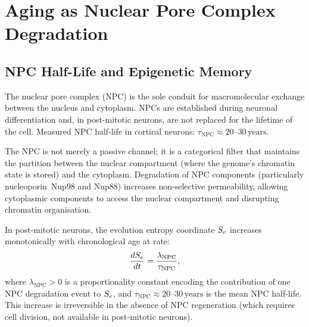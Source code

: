 \section{Aging as Nuclear Pore Complex Degradation}
\label{sec:aging_npc}

\subsection{NPC Half-Life and Epigenetic Memory}

The nuclear pore complex (NPC) is the sole conduit for macromolecular
exchange between the nucleus and cytoplasm. NPCs are established during
neuronal differentiation and, in post-mitotic neurons, are not replaced for
the lifetime of the cell. Measured NPC half-life in cortical neurons:
$\tau_{\mathrm{NPC}} \approx 20\text{--}30\,\mathrm{years}$.

The NPC is not merely a passive channel; it is a categorical filter that
maintains the partition between the nuclear compartment (where the genome's
chromatin state is stored) and the cytoplasm. Degradation of NPC components
(particularly nucleoporin~Nup98 and Nup88) increases non-selective
permeability, allowing cytoplasmic components to access the nuclear
compartment and disrupting chromatin organisation.

\begin{theorem}
\label{thm:aging_se}
In post-mitotic neurons, the evolution entropy coordinate $S_e$ increases
monotonically with chronological age at rate:
\begin{equation}
  \frac{dS_e}{dt} = \frac{\lambda_{\mathrm{NPC}}}{\tau_{\mathrm{NPC}}},
  \label{eq:aging_rate}
\end{equation}
where $\lambda_{\mathrm{NPC}} > 0$ is a proportionality constant encoding
the contribution of one NPC degradation event to $S_e$, and
$\tau_{\mathrm{NPC}} \approx 20\text{--}30\,\mathrm{years}$ is the mean
NPC half-life. This increase is irreversible in the absence of NPC
regeneration (which requires cell division, not available in post-mitotic
neurons).
\end{theorem}

